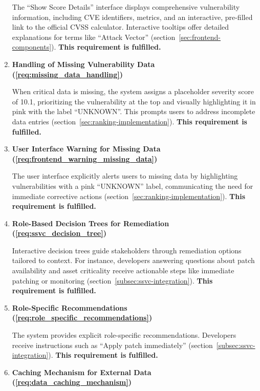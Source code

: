 \begin{enumerate}
    The \enquote{Show Score Details} interface displays comprehensive vulnerability information, including \ac{CVE} identifiers, metrics, and an interactive, pre-filled link to the official \ac{CVSS} calculator. Interactive tooltips offer detailed explanations for terms like \enquote{Attack Vector} (section~\ref{sec:frontend-components}). \textbf{This requirement is fulfilled.}
	      	      
    \item \textbf{Handling of Missing Vulnerability Data (\ref{req:missing_data_handling})}
    
    When critical data is missing, the system assigns a placeholder severity score of 10.1, prioritizing the vulnerability at the top and visually highlighting it in pink with the label \enquote{UNKNOWN}. This prompts users to address incomplete data entries (section~\ref{sec:ranking-implementation}). \textbf{This requirement is fulfilled.}
	      	      
    \item \textbf{User Interface Warning for Missing Data (\ref{req:frontend_warning_missing_data})}
	      	      
    The user interface explicitly alerts users to missing data by highlighting vulnerabilities with a pink \enquote{UNKNOWN} label, communicating the need for immediate corrective actions (section~\ref{sec:ranking-implementation}). \textbf{This requirement is fulfilled.}
	      	      
    \item \textbf{Role-Based Decision Trees for Remediation (\ref{req:ssvc_decision_tree})}
	      	      
    Interactive decision trees guide stakeholders through remediation options tailored to context. For instance, developers answering questions about patch availability and asset criticality receive actionable steps like immediate patching or monitoring (section~\ref{subsec:ssvc-integration}). \textbf{This requirement is fulfilled.}
	      	      
    \item \textbf{Role-Specific Recommendations (\ref{req:role_specific_recommendations})}
	      	      
    The system provides explicit role-specific recommendations. Developers receive instructions such as \enquote{Apply patch immediately} (section~\ref{subsec:ssvc-integration}). \textbf{This requirement is fulfilled.}
	      	      
    \item \textbf{Caching Mechanism for External Data (\ref{req:data_caching_mechanism})}
	      	      

\end{enumerate}
